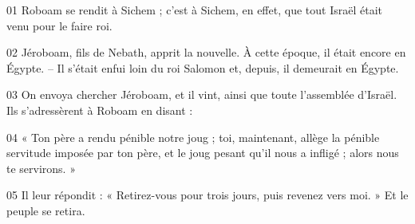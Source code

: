 01 Roboam se rendit à Sichem ; c’est à Sichem, en effet, que tout Israël était venu pour le faire roi.

02 Jéroboam, fils de Nebath, apprit la nouvelle. À cette époque, il était encore en Égypte. – Il s’était enfui loin du roi Salomon et, depuis, il demeurait en Égypte.

03 On envoya chercher Jéroboam, et il vint, ainsi que toute l’assemblée d’Israël. Ils s’adressèrent à Roboam en disant :

04 « Ton père a rendu pénible notre joug ; toi, maintenant, allège la pénible servitude imposée par ton père, et le joug pesant qu’il nous a infligé ; alors nous te servirons. »

05 Il leur répondit : « Retirez-vous pour trois jours, puis revenez vers moi. » Et le peuple se retira.
